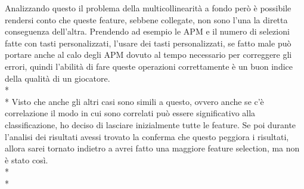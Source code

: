 Analizzando questo il problema della multicollinearità a fondo però è possibile rendersi conto che queste feature, sebbene collegate, non sono l’una la diretta conseguenza dell’altra. Prendendo ad esempio le APM e il numero di selezioni fatte con tasti personalizzati, l’usare dei tasti personalizzati, se fatto male può portare anche al calo degli APM dovuto al tempo necessario per correggere gli errori, quindi l'abilità di fare queste operazioni correttamente è un buon indice della qualità di un giocatore.\\*\\*
Visto che anche gli altri casi sono simili a questo, ovvero anche se c'è correlazione il modo in cui sono correlati può essere significativo alla classificazione, ho deciso di lasciare inizialmente tutte le feature. Se poi durante l'analisi dei risultati avessi trovato la conferma che questo peggiora i risultati, allora sarei tornato indietro a avrei fatto una maggiore feature selection, ma non è stato così.\\*\\*


